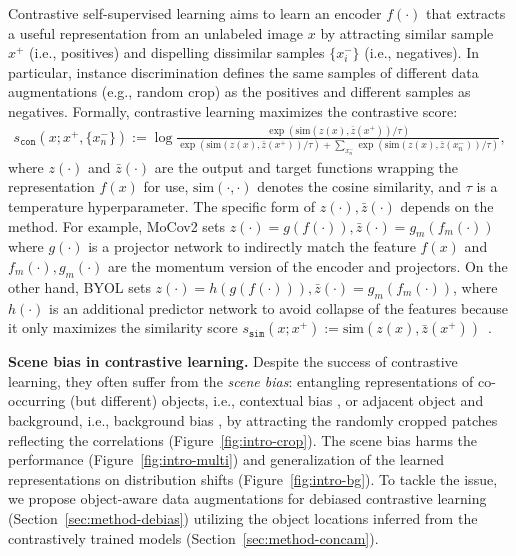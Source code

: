 \documentclass{article}
\begin{document}
Contrastive self-supervised learning aims to learn an encoder $f(\cdot)$ that extracts a useful representation from an unlabeled image $x$ by attracting similar sample $x^+$ (i.e., positives) and dispelling dissimilar samples $\{x^-_i\}$ (i.e., negatives). In particular, instance discrimination \citep{wu2018unsupervised} defines the same samples of different data augmentations (e.g., random crop) as the positives and different samples as negatives. Formally, contrastive learning maximizes the contrastive score:
\begin{align}
s_{\texttt{con}}(x; x^+, \{x^-_n\})
:= \log \frac{\exp(\mathrm{sim}(z(x), \bar{z}(x^+)) / \tau)}{\exp(\mathrm{sim}(z(x), \bar{z}(x^+)) / \tau) + \sum_{x^-_n} \exp(\mathrm{sim}(z(x), \bar{z}(x^-_n)) / \tau)},
\label{eq:con-score}
\end{align}
where $z(\cdot)$ and $\bar{z}(\cdot)$ are the output and target functions wrapping the representation $f(x)$ for use, $\mathrm{sim}(\cdot,\cdot)$ denotes the cosine similarity, and $\tau$ is a temperature hyperparameter.
The specific form of $z(\cdot),\bar{z}(\cdot)$ depends on the method. For example, MoCov2 \citep{chen2020improved} sets $z(\cdot) = g(f(\cdot)), \bar{z}(\cdot) = g_m(f_m(\cdot))$ where $g(\cdot)$ is a projector network to indirectly match the feature $f(x)$ and $f_m(\cdot),g_m(\cdot)$ are the momentum version of the encoder and projectors. 
On the other hand, BYOL \citep{grill2020bootstrap} sets $z(\cdot) = h(g(f(\cdot))), \bar{z}(\cdot) = g_m(f_m(\cdot))$, where $h(\cdot)$ is an additional predictor network to avoid collapse of the features because it only  
maximizes the similarity score $s_{\texttt{sim}}(x; x^+) := \mathrm{sim}(z(x), \bar{z}(x^+))$~\citep{grill2020bootstrap,chen2021exploring}.


\textbf{Scene bias in contrastive learning.}
Despite the success of contrastive learning, they often suffer from the \textit{scene bias}: entangling representations of co-occurring (but different) objects, i.e., contextual bias \citep{singh2020don}, or adjacent object and background, i.e., background bias \citep{xiao2021noise}, by attracting the randomly cropped patches reflecting the correlations (Figure~\ref{fig:intro-crop}). The scene bias harms the performance (Figure~\ref{fig:intro-multi}) and generalization of the learned representations on distribution shifts (Figure~\ref{fig:intro-bg}). To tackle the issue, we propose object-aware data augmentations for debiased contrastive learning (Section~\ref{sec:method-debias}) utilizing the object locations inferred from the contrastively trained models (Section~\ref{sec:method-concam}). 
\end{document}
